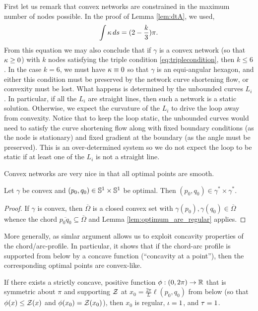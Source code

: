 \documentclass[12pt]{amsart}
\begin{document}
\begin{remark}
First let us remark that convex networks are constrained in the maximum number of nodes possible. In the proof of Lemma \ref{lem:dtA}, we used,
\[
\int \operatorname{\kappa} ds = (2 - \frac{k}{3}) \pi.
\]
From this equation we may also conclude that if \(\gamma\) is a convex network (so that \(\operatorname{\kappa} \geq 0\)) with \(k\) nodes satisfying the triple condition \eqref{eq:triplecondition}, then \(k \leq 6\). In the case \(k = 6\), we must have \(\operatorname{\kappa} \equiv 0\) so that \(\gamma\) is an equi-angular hexagon, and either this condition must be preserved by the network curve shortening flow, or convexity must be lost. What happens is determined by the unbounded curves \(L_i\). In particular, if all the \(L_i\) are straight lines, then such a network is a static solution. Otherwise, we expect the curvature of the \(L_i\) to drive the loop away from convexity. Notice that to keep the loop static, the unbounded curves would need to satisfy the curve shortening flow along with fixed boundary conditions (as the node is stationary) and fixed gradient at the boundary (as the angle must be preserved). This is an over-determined system so we do not expect the loop to be static if at least one of the \(L_i\) is not a straight line.
\end{remark}

Convex networks are very nice in that all optimal points are smooth.

\begin{lemma}
\label{lem:convex_regular}

Let \(\gamma\) be convex and \((p_0,q_0) \in \mathbb{S}^1 \times \mathbb{S}^1\) be optimal. Then \((p_0, q_0) \in \gamma^{\ast} \times \gamma^{\ast}\).
\end{lemma}

\begin{proof}
If $\gamma$ is convex, then $\overline{\Omega}$ is a closed convex set with $\gamma(p_0), \gamma(q_0) \in \overline{\Omega}$ whence the chord $\overline{p_0q_0} \subseteq \overline{\Omega}$ and Lemma \ref{lem:optimum_are_regular} applies.
\end{proof}

More generally, as simlar argument allows us to exploit concavity properties of the chord/arc-profile. In particular, it shows that if the chord-arc profile is supported from below by a concave function (``concavity at a point''), then the corresponding optimal points are convex-like.

\begin{lemma}
\label{lem:concave_barrier}
If there exists a strictly concave, positive function $\phi: (0, 2\pi) \to \mathbb{R}$ that is symmetric about $\pi$ and supporting $\operatorname{\mathcal{Z}}$ at $x_0=\tfrac{2\pi}{L} \ell(p_0,q_0)$ from below (so that $\phi(x) \leq \operatorname{\mathcal{Z}}(x)$ and $\phi(x_0)=\operatorname{\mathcal{Z}}(x_0)$), then $x_0$ is regular, $\operatorname{\iota} = 1$, and $\operatorname{\tau} = 1$.
\end{lemma}
\end{document}
